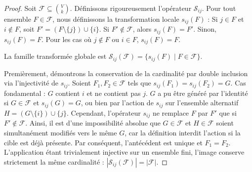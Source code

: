 \documentclass[12pt]{article}
\begin{document}
\begin{proof}
Soit $\mathcal{F} \subseteq \binom{V}{k}$. D\'efinissons rigoureusement l'op\'erateur $\mathcal{S}_{ij}$.
Pour tout ensemble $F \in \mathcal{F}$, nous d\'efinissons la transformation locale $s_{ij}(F)$ :
Si $j \in F$ et $i \notin F$, soit $F' = (F \setminus \{j\}) \cup \{i\}$. Si $F' \notin \mathcal{F}$, alors $s_{ij}(F) = F'$. Sinon, $s_{ij}(F) = F$.
Pour les cas o\`u $j \notin F$ ou $i \in F$, $s_{ij}(F) = F$.

La famille transform\'ee globale est $\mathcal{S}_{ij}(\mathcal{F}) = \{ s_{ij}(F) \mid F \in \mathcal{F} \}$.

Premi\`erement, d\'emontrons la conservation de la cardinalit\'e par double inclusion via l'injectivit\'e de $s_{ij}$.
Soient $F_1, F_2 \in \mathcal{F}$ tels que $s_{ij}(F_1) = s_{ij}(F_2) = G$.
Cas fondamental : $G$ contient $i$ et ne contient pas $j$. $G$ a pu \^etre g\'en\'er\'e par l'identit\'e si $G \in \mathcal{F}$ et $s_{ij}(G) = G$, ou bien par l'action de $s_{ij}$ sur l'ensemble alternatif $H = (G \setminus \{i\}) \cup \{j\}$.
Cependant, l'op\'erateur $s_{ij}$ ne remplace $F$ par $F'$ que si $F' \notin \mathcal{F}$. Ainsi, il est d'une impossibilit\'e absolue que $G \in \mathcal{F}$ et $H \in \mathcal{F}$ soient simultan\'ement modifi\'es vers le m\^eme $G$, car la d\'efinition interdit l'action si la cible est d\'ej\`a pr\'esente. Par cons\'equent, l'ant\'ec\'edent est unique et $F_1 = F_2$.
L'application \'etant trivialement injective sur un ensemble fini, l'image conserve strictement la m\^eme cardinalit\'e : $|\mathcal{S}_{ij}(\mathcal{F})| = |\mathcal{F}|$.


\end{proof}
\end{document}
